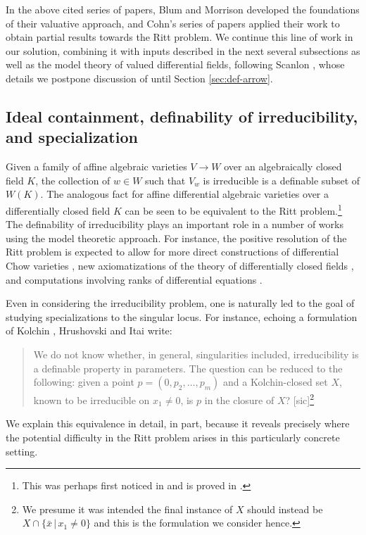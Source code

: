 \documentclass[12pt]{amsart}
\theoremstyle{definition}
\numberwithin{subcase}{cases}
\theoremstyle{remark}
\begin{document}
In the above cited series of papers, Blum and Morrison developed the foundations of their valuative approach, and Cohn's series of papers applied their work to obtain partial results towards the Ritt problem. We continue this line of work in our solution, combining it with inputs described in the next several subsections as well as the model theory of valued differential fields, following Scanlon \cite{Scanlon00}, whose details we postpone discussion of until Section \ref{sec:def-arrow}. 

\subsection{Ideal containment, definability of irreducibility, and specialization}
Given a family of affine algebraic varieties $V \rightarrow W$ over an algebraically closed field $K$, the collection of $w \in W$ such that $V_w$ is irreducible is a definable subset of $W(K)$. The analogous fact for affine differential algebraic varieties over a differentially closed field $K$ can be seen to be equivalent to the Ritt problem.\footnote{This was perhaps first noticed in \cite{van1978model} and is proved in \cite{harrison2012nonstandard}.} The definability of irreducibility plays an important role in a number of works using the model theoretic approach. For instance, the positive resolution of the Ritt problem is expected to allow for more direct constructions of differential Chow varieties \cite{freitag2017differential}, new axiomatizations of the theory of differentially closed fields \cite{LeonSanchez16}, and computations involving ranks of differential equations \cite{freitag2025algebraic}. 

Even in considering the irreducibility problem, one is naturally led to the goal of studying specializations to the singular locus. For instance, echoing a formulation of Kolchin \cite{Kolchin73}, Hrushovski and Itai \cite{hrushovski2003model} write:

\begin{quote}
We do not know whether, in general, singularities included, irreducibility is a definable property in parameters. The question can be reduced to the following: given a point $p = (0,p_2, \ldots ,  p_m)$ and a Kolchin-closed set $X$, known to be irreducible on $x_1 \neq 0$, is $p$ in the closure of $X$? [sic]\footnote{We presume it was intended the final instance of $X$ should instead be $X \cap \{\bar x \, | \,  x_1 \neq 0 \}$ and this is the formulation we consider hence.} %
\end{quote}
We explain this equivalence in detail, in part, because it reveals precisely where the potential difficulty in the Ritt problem arises in this particularly concrete setting.
\end{document}
